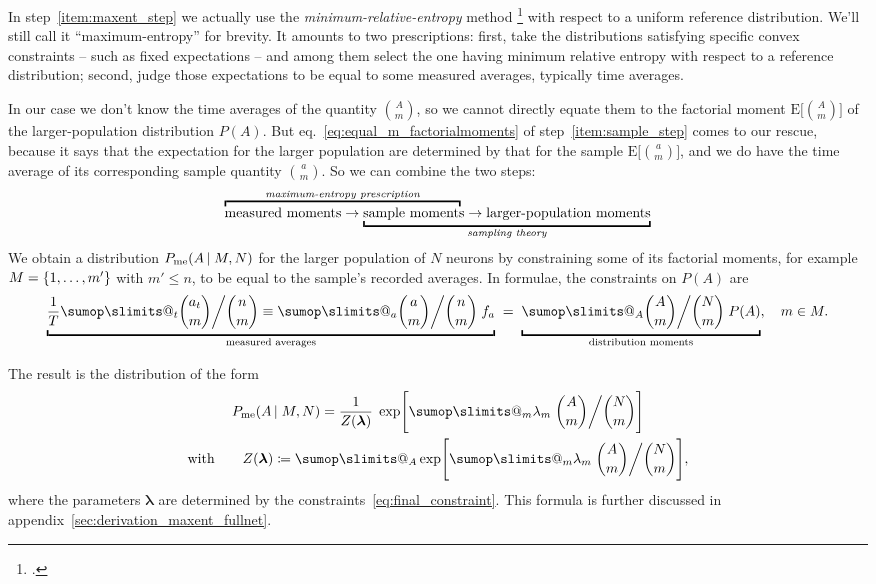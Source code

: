 \documentclass[\ifafour a4paper,12pt,\else a5paper,10pt,\fi%
onecolumn,oneside,article,%
british%
]{memoir}
\makeatletter
\theoremstyle{remark}
\theoremstyle{innote}
\def\sum{\DOTSI\sumop\slimits@}
\newcommand*{\citep}{\footcites}
\newcommand*{\defd}{\coloneqq}
\renewcommand*{\le}{\leqslant}%
\DeclarePairedDelimiter\set{\{}{\}}
\newcommand*{\E}{\mathrm{E}}
\renewcommand*{\|}{\nonscript\,\vert\nonscript\;\mathopen{}}
\newcommand*{\sect}{\S}%
\newcommand*{\eqn}{eq.}%
\newcommand*{\yAv}{A}
\newcommand*{\yav}{a}
\newcommand*{\yff}{f}
\newcommand*{\ya}{\yav}%
\newcommand*{\yA}{\yAv}%
\newcommand*{\yll}{\bm{\lambda}}
\newcommand*{\yl}{\lambda}
\newcommand*{\px}{P_{\text{me}}}
\newcommand*{\pxxx}{P}
\makeatother
\begin{document}
\medskip


In step~\ref{item:maxent_step} we actually use the
\emph{minimum-relative-entropy} method
\citep{hobsonetal1973,csiszar1985}[\sect~5.2.2]{sivia1996_r2006} with
respect to a uniform reference distribution. We'll still call it
\enquote{maximum-entropy} for brevity. It amounts to two prescriptions:
first, take the distributions satisfying specific convex constraints --
such as fixed expectations -- and among them select the one having minimum
relative entropy with respect to a reference distribution; second, judge
those expectations to be equal to some measured averages, typically time
averages.

In our case we don't know the time averages of the quantity
$\binom{\yA}{m}$, so we cannot directly equate them to the factorial moment
$\E\bigl[\binom{\yA}{m}\bigr]$ of the larger-population distribution
$\pxxx(\yA)$. But \eqn~\eqref{eq:equal_m_factorialmoments} of
step~\ref{item:sample_step} comes to our rescue, because it says that the
expectation for the larger population are determined by that for the sample
$\E\bigl[\binom{\ya}{m}\bigr]$, and we do have the time average of its
corresponding sample quantity $\binom{\ya}{m}$. So we can combine the two
steps:
\begin{equation*}
  \label{eq:chain_prescription_moments}
  \mathrlap{\overbracket{\phantom{\text{measured averages} \rightarrow
        \text{sample moments}}}^{\textit{maximum-entropy prescription}}}
  \text{measured moments} \rightarrow
        \underbracket{\text{sample moments}
  \rightarrow
    \text{larger-population moments}}_{\textit{sampling theory}}
\end{equation*}
We obtain a distribution $\px(\yA \| M, N)$ for the larger population of
$N$ neurons by constraining some of its factorial moments, for example
$M=\set{1,\dotsc,m'}$ with $m'\le n$, to be equal to the sample's recorded
averages. In formulae, the constraints on $\pxxx(\yA)$ are
\begin{equation}
  \label{eq:final_constraint}
\underbracket{\frac{1}{T}\sum_{t}\binom{\ya_{t}}{m}\bigg/\binom{n}{m}
  \equiv
   \sum_{\ya}
  \binom{\ya}{m}\bigg/  \binom{n}{m} \; \yff_{\ya}}_{\text{measured averages}}
  \mathrel{\;=\;}
   \underbracket{\sum_{\yA}
     \binom{\yA}{m}\bigg/  \binom{N}{m} \; \pxxx(\yA)}_{\text{distribution moments}},
   \quad m\in M.
\end{equation}

The result is the distribution of the form
\begin{equation}
  \label{eq:app_maxent_pop_first}
  \begin{gathered}
  \px(\yA \| M, N)  = \frac{1}{Z(\yll)}\;
  \exp\Biggl[\sum_{m}\yl_{m}\;
  \binom{\yA}{m}\bigg/\binom{N}{m}
  \Biggr]
  \\
\text{with}\qquad  Z(\yll)\defd \sum_{\yA}
  \exp\Biggl[\sum_{m}\yl_{m}\;
  \binom{\yA}{m}\bigg/\binom{N}{m}
  \Biggr],
\end{gathered}
\end{equation}
where the parameters $\yll$ are determined by the
constraints~\eqref{eq:final_constraint}. This formula is further discussed
in appendix~\ref{sec:derivation_maxent_fullnet}.
\end{document}
